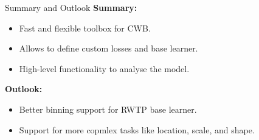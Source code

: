 \documentclass[t,10pt]{beamer}
\newcommand{\backupend}{
   \setcounter{framenumber}{\value{finalframe}}
}
\begin{document}
\begin{frame}{Summary and Outlook}
  \textbf{Summary:}
  \begin{itemize}
    \item Fast and flexible toolbox for CWB.
    \item Allows to define custom losses and base learner.
    \item High-level functionality to analyse the model.
  \end{itemize}
  \textbf{Outlook:}
  \begin{itemize}
    \item Better binning support for RWTP base learner.
    \item Support for more copmlex tasks like location, scale, and shape.
  \end{itemize}
\end{frame}




\backupend
\end{document}

